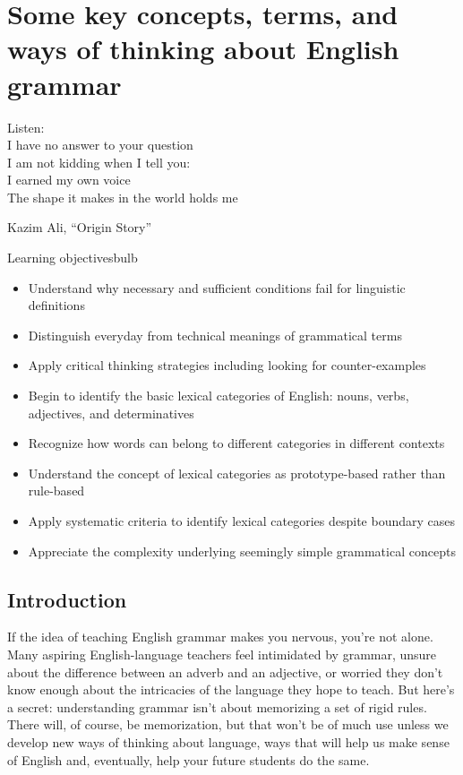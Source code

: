 \chapter{Some key concepts, terms, and ways of thinking about English grammar}\label{ch:1}


\epigraph{Listen:\\
I have no answer to your question\\
I am not kidding when I tell you:\\
I earned my own voice\\
The shape it makes in the world holds me}{Kazim Ali, \enquote{Origin Story}}

\begin{tblsframedsymbol}{Learning objectives}{bulb}
  \begin{itemize}[noitemsep, leftmargin=*]
      \item Understand why necessary and sufficient conditions fail for linguistic definitions
      \item Distinguish everyday from technical meanings of grammatical terms
      \item Apply critical thinking strategies including looking for counter-examples
      \item Begin to identify the basic lexical categories of English: nouns, verbs, adjectives, and determinatives
      \item Recognize how words can belong to different categories in different contexts
      \item Understand the concept of lexical categories as prototype-based rather than rule-based
      \item Apply systematic criteria to identify lexical categories despite boundary cases
      \item Appreciate the complexity underlying seemingly simple grammatical concepts
  \end{itemize}
  \end{tblsframedsymbol}
  
\section{Introduction}\label{sec:intro1}

If the idea of teaching English grammar makes you nervous, you're not alone. Many aspiring English-language teachers feel intimidated by grammar, unsure about the difference between an adverb and an adjective, or worried they don't know enough about the intricacies of the language they hope to teach. But here's a secret: understanding grammar isn't about memorizing a set of rigid rules. There will, of course, be memorization, but that won't be of much use unless we develop new ways of thinking about language, ways that will help us make sense of English and, eventually, help your future students do the same.

